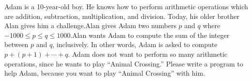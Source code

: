 Adam is a 10-year-old boy.
He knows how to perform arithmetic operations which are addition, 
subtraction, multiplication, and division.
Today, his older brother Alan gives him a challenge.Alan gives Adam two 
numbers $p$ and $q$ where $-1000\le p\le q\le 1000$.Alan wants Adam to 
compute the sum of the integer between $p$ and $q$, inclusively.
In other words, Adam is asked to compute $p+(p+1)+\cdots+q$.
Adam does not want to perform so many arithmetic operations, 
since he wants to play ``Animal Crossing.'' 
Please write a program to help Adam, because you want to play 
``Animal Crossing'' with him.
